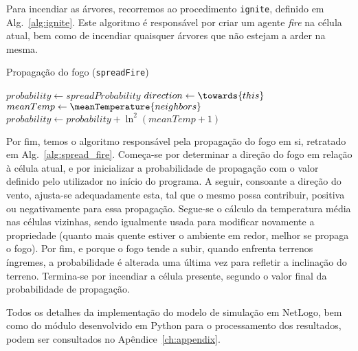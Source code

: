 Para incendiar as árvores, recorremos ao procedimento \texttt{ignite}, definido em Alg.~\ref{alg:ignite}.
Este algoritmo é responsável por criar um agente \textit{fire} na célula atual, bem como de incendiar quaisquer árvores que não estejam a arder na mesma.


\begin{algorithm}
    \caption{Propagação do fogo (\texttt{spreadFire})}\label{alg:spread_fire}
    $probability \gets spreadProbability$\;
    $direction \gets \towards{this}$\;
    $meanTemp \gets \meanTemperature{neighbors}$\;
    $probability \gets probability + \ln^2{(meanTemp + 1)}$\;
\end{algorithm}

Por fim, temos o algoritmo responsável pela propagação do fogo em si, retratado em Alg.~\ref{alg:spread_fire}.
Começa-se por determinar a direção do fogo em relação à célula atual, e por inicializar a probabilidade de propagação com o valor definido pelo utilizador no início do programa.
A seguir, consoante a direção do vento, ajusta-se adequadamente esta, tal que o mesmo possa contribuir, positiva ou negativamente para essa propagação.
Segue-se o cálculo da temperatura média nas células vizinhas, sendo igualmente usada para modificar novamente a propriedade (quanto mais quente estiver o ambiente em redor, melhor se propaga o fogo).
Por fim, e porque o fogo tende a subir, quando enfrenta terrenos íngremes, a probabilidade é alterada uma última vez para refletir a inclinação do terreno.
Termina-se por incendiar a célula presente, segundo o valor final da probabilidade de propagação.

Todos os detalhes da implementação do modelo de simulação em NetLogo, bem como do módulo desenvolvido em Python para o processamento dos resultados, podem ser consultados no Apêndice~\ref{ch:appendix}.